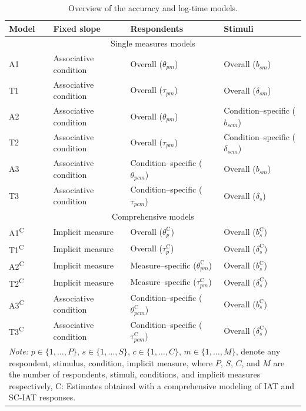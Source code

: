 \documentclass[12pt]{book}
\begin{document}
\begin{table}[h!]
	\centering\onehalfspacing
	\caption{Overview of the accuracy and log-time models.}
	\label{tab:overviewC} 
	\begin{tabularx}{\linewidth}{p{1.5cm} p{4cm} p{4.5cm} p{4.5cm} }
		\toprule
		Model & Fixed slope & Respondents & Stimuli\\
		\midrule
		\multicolumn{4}{c}{Single measures models}\\
		A1  & Associative condition &  Overall  ($\theta_{pm}$)  &  Overall ($b_{sm}$)  \\
		T1  & Associative condition &  Overall ($\tau_{pm}$)  &  Overall ($\delta_{sm}$)\\
		A2  & Associative condition &  Overall ($\theta_{pm}$)  &  Condition--specific ($b_{scm}$) \\
		T2  & Associative condition &  Overall ($\tau_{pm}$)  &  Condition--specific ($\delta_{scm}$)\\
		A3  & Associative condition &  Condition--specific ($\theta_{pcm}$)  &  Overall ($b_{sm}$) \\
		T3  & Associative condition &  Condition--specific ($\tau_{pcm}$)  &  Overall ($\delta_{s}$)\\
		\midrule
		\multicolumn{4}{c}{Comprehensive models}\\
		A1\textsuperscript{C}  & Implicit measure &  Overall  ($\theta_p^\text{C}$)  &  Overall ($b_s^\text{C}$)  \\
		T1\textsuperscript{C}  & Implicit measure &  Overall ($\tau_p^\text{C}$)  &  Overall ($\delta_s^\text{C}$)\\
		A2\textsuperscript{C}  & Implicit measure &  Measure--specific ($\theta_{pm}^\text{C}$) &   Overall ($b_s^\text{C}$)  \\
		T2\textsuperscript{C}   & Implicit measure &  Measure--specific ($\tau_{pm}^\text{C}$)  &  Overall ($\delta_{s}^\text{C}$)\\
		A3\textsuperscript{C}  & Associative condition &   Condition--specific ($\theta_{pcm}^\text{C}$)  &   Overall ($b_s^\text{C}$)  \\
		T3\textsuperscript{C}  & Associative condition &  Condition--specific ($\tau_{pcm}^\text{C}$)  &  Overall ($\delta_{s}^\text{C}$)\\
		
		\bottomrule
		\multicolumn{4}{p{15cm}}{\footnotesize{\emph{Note:} $p \in \{1, \ldots, P\}$, $s \in \{1,\ldots, S\}$, $c \in \{1,\ldots, C\}$, $m \in \{1, \ldots, M\}$, denote any respondent, stimulus, condition, implicit measure, where $P$, $S$, $C$, and $M$ are the number of respondents, stimuli, conditions, and implicit measures respectively, C: Estimates obtained with a comprehensive modeling of IAT and SC-IAT responses.}}
	\end{tabularx}
\end{table}
\end{document}
